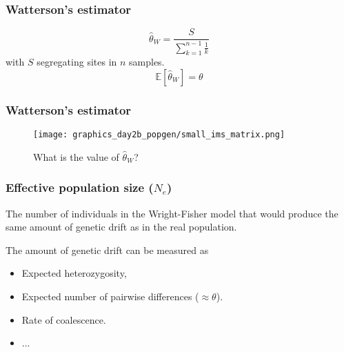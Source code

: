 \documentclass{beamer}
\newcommand{\E}{\mathbb{E}}
\newcommand{\1}{\ensuremath{\mathbf{1}}}
\begin{document}
%
%
%
\begin{frame}\frametitle{Watterson’s estimator}
	\begin{equation}
		\hat{\theta}_W = \frac{S}{\sum_{k=1}^{n-1}\tfrac{1}{k}}
	\end{equation}
	with $S$ segregating sites in $n$ samples.
	\begin{equation}
		\E [\hat{\theta}_W] = \theta
	\end{equation}
\end{frame}
%
%
%
\begin{frame}\frametitle{Watterson’s estimator}
	\begin{figure}
	\begin{center}
		\texttt{[image: graphics\_day2b\_popgen/small\_ims\_matrix.png]}
	\end{center}
	\caption{What is the value of $\hat\theta_W$?}
	\end{figure}
\end{frame}
%
%
%
\begin{frame}\frametitle{Effective population size ($N_e$)}
	\begin{block}{}
		The number of individuals in the Wright-Fisher model that would produce the same amount of genetic drift as in the real population.
	\end{block}
	The amount of genetic drift can be measured as
	\begin{itemize}
		\item Expected heterozygosity,
		\item Expected number of pairwise differences ($\approx \theta$).
		\item Rate of coalescence.
		\item ...
	\end{itemize}
\end{frame}
\end{document}
